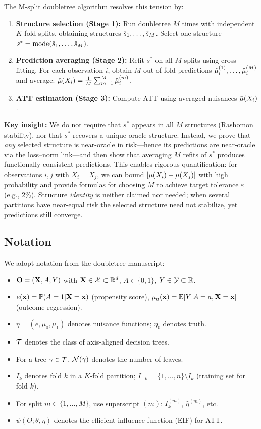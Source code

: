 \documentclass[12pt]{article}
\begin{document}
The M-split doubletree algorithm resolves this tension by:
\begin{enumerate}
\item \textbf{Structure selection (Stage 1):} Run doubletree $M$ times with independent $K$-fold splits, obtaining structures $\hat{s}_1, \ldots, \hat{s}_M$. Select one structure $s^* = \text{mode}(\hat{s}_1, \ldots, \hat{s}_M)$.
\item \textbf{Prediction averaging (Stage 2):} Refit $s^*$ on all $M$ splits using cross-fitting. For each observation $i$, obtain $M$ out-of-fold predictions $\hat{\mu}_i^{(1)}, \ldots, \hat{\mu}_i^{(M)}$ and average: $\bar{\mu}(X_i) = \frac{1}{M} \sum_{m=1}^M \hat{\mu}_i^{(m)}$.
\item \textbf{ATT estimation (Stage 3):} Compute ATT using averaged nuisances $\bar{\mu}(X_i)$.
\end{enumerate}

\textbf{Key insight:} We do not require that $s^*$ appears in all $M$ structures (Rashomon stability), nor that $s^*$ recovers a unique oracle structure. Instead, we prove that \emph{any} selected structure is near-oracle in risk---hence its predictions are near-oracle via the loss--norm link---and then show that averaging $M$ refits of $s^*$ produces functionally consistent predictions. This enables rigorous quantification: for observations $i, j$ with $X_i = X_j$, we can bound $|\bar{\mu}(X_i) - \bar{\mu}(X_j)|$ with high probability and provide formulas for choosing $M$ to achieve target tolerance $\varepsilon$ (e.g., 2\%). Structure \emph{identity} is neither claimed nor needed; when several partitions have near-equal risk the selected structure need not stabilize, yet predictions still converge.

\subsection{Notation}

We adopt notation from the doubletree manuscript:
\begin{itemize}[nosep]
\item $\mathbf{O} = (\mathbf{X}, A, Y)$ with $\mathbf{X} \in \mathcal{X} \subset \mathbb{R}^d$, $A \in \{0,1\}$, $Y \in \mathcal{Y} \subset \mathbb{R}$.
\item $e(\mathbf{x}) = \mathbb{P}(A=1 | \mathbf{X} = \mathbf{x})$ (propensity score), $\mu_a(\mathbf{x}) = \mathbb{E}[Y | A = a, \mathbf{X} = \mathbf{x}]$ (outcome regression).
\item $\eta = (e, \mu_0, \mu_1)$ denotes nuisance functions; $\eta_0$ denotes truth.
\item $\mathcal{T}$ denotes the class of axis-aligned decision trees.
\item For a tree $\gamma \in \mathcal{T}$, $\mathcal{N}(\gamma)$ denotes the number of leaves.
\item $I_k$ denotes fold $k$ in a $K$-fold partition; $I_{-k} = \{1, \ldots, n\} \setminus I_k$ (training set for fold $k$).
\item For split $m \in \{1, \ldots, M\}$, use superscript $(m)$: $I_k^{(m)}$, $\hat\eta^{(m)}$, etc.
\item $\psi(O; \theta, \eta)$ denotes the efficient influence function (EIF) for ATT.
\end{itemize}
\end{document}
